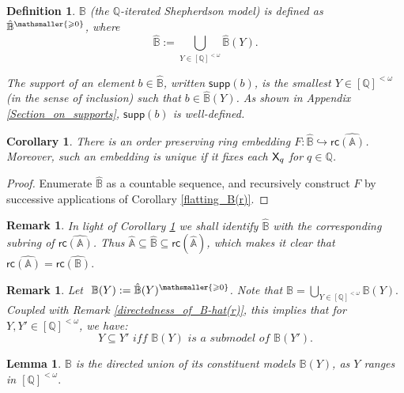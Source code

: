 \documentclass{amsart}
\newcommand{\qee} {\hspace*{2mm}\hfill \ding{109}}
\renewcommand{\geq}{\geqslant}
\newtheorem{define}[theorem]{Definition}
\newenvironment{definition}{\begin{define} \rm}{\qee\end{define}}
\newtheorem{lem}[theorem]{Lemma}
\newtheorem{cor}[theorem]{Corollary}
\newtheorem{rem}[theorem]{Remark}
\newcommand{\X}{{\sf X}}
\newcommand{\fsvar}{Y}
\begin{document}
\begin{definition}\label{B-definition}
$\mathbb{B}$ (the $\mathbb{Q}$-iterated Shepherdson model) is defined as $\hat{\mathbb{B}}^{\mathsmaller{\geq 0}}$, where $$\hat{\mathbb{B}}:=\bigcup\limits_{\fsvar\in [\mathbb{Q}]^{<\omega}}\hat{\mathbb{B}}(\fsvar).$$

The \emph{support} of an element $b\in\hat{\mathbb{B}}$, written $\mathsf{supp}(b)$, is the smallest 
$\fsvar\in[\mathbb{Q}]^{<\omega}$ (in the sense of inclusion) such that $b\in \hat{\mathbb{B}}(\fsvar)$. 
As shown in Appendix \ref{Section_on_supports}, $\mathsf{supp}(b)$ is well-defined. 
\end{definition}

\begin{cor}  \label{flatting}There is an order preserving ring embedding $F:\hat{\mathbb{B}}\hookrightarrow \mathsf{rc}\hat{(\mathbb{A})}$. Moreover, such an embedding is unique if it fixes each $\X_q$ for $q\in \mathbb{Q}$.   
\end{cor}

\begin{proof}
Enumerate $\hat{\mathbb{B}}$ as a countable sequence, and recursively construct $F$ by successive applications of Corollary \ref{flatting_B(r)}.
\end{proof}

\begin{rem} \label{rc(A)=rc(B)}In light of Corollary \ref{flatting} we shall identify $\hat{\mathbb{B}}$ with the corresponding subring of $\mathsf{rc}\hat{(\mathbb{A})}$. Thus $\hat{\mathbb{A}}\subseteq \hat{\mathbb{B}} \subseteq \mathsf{rc}(\hat{\mathbb{A}})$, which makes it clear that $\mathsf{rc}\hat{(\mathbb{A})}=\mathsf{rc}\hat{(\mathbb{B})}.$
\end{rem}

\begin{rem} \label{directness_of_B(r)}Let $~\mathbb B(\fsvar) :=\hat{\mathbb{B}}(\fsvar)^{\mathsmaller{\geq 0}}$. Note that $\mathbb{B}=\bigcup\limits_{\fsvar\in [\mathbb{Q}]^{<\omega}}\mathbb{B}(\fsvar).$ 
Coupled with Remark \ref{directedness_of_B-hat(r)}, this implies that for $\fsvar,\fsvar' \in [\mathbb{Q}]^{<\omega}$, we have:
$$\fsvar\subseteq \fsvar'\textit{~iff~} \mathbb{B}(\fsvar)\textit{~is~a~submodel~of~} \mathbb{B}(\fsvar').$$
\end{rem}

\begin{lem} \label{B_directed_union}$\mathbb{B}$ is the directed union of its constituent models $\mathbb{B}(\fsvar)$, 
as $\fsvar$ ranges in $[\mathbb{Q}]^{<\omega}.$ 
\end{lem}
\end{document}
